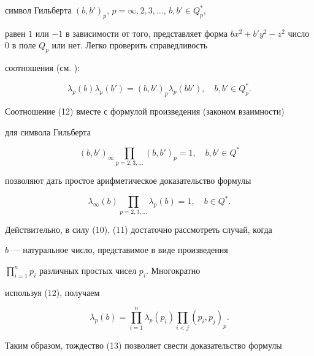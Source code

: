 символ Гильберта $(b,b')_p$, $p=\infty,2,3,\dotsc$, $b,b'\in Q^*_p$, 


равен $1$ или $-1$ в зависимости от того, представляет форма $b x^2+b' 


y^2-z^2$ число $0$ в поле $Q_p$ или нет. Легко проверить справедливость 


соотношения (см. \cite{1}): 


\begin{equation} 


\lambda_p(b)\lambda_p(b')=(b,b')_p 


\lambda_p(b b'),\quad b,b'\in Q^*_p. 


\end{equation} 


 


Соотношение (12) вместе с формулой произведения (законом взаимности) 


для символа Гильберта \cite{4} 


\begin{equation} 


(b,b')_\infty\prod_{p=2,3,\dotsc}(b,b')_p=1,\quad 


b,b'\in Q^* 


\end{equation} 


позволяют дать простое арифметическое доказательство формулы 


\begin{equation} 


\lambda_\infty(b)\prod_{p=2,3,\dotsc}\lambda_p(b)=1,\quad 


b\in Q^*. 


\end{equation} 


Действительно, в силу (10), (11) достаточно рассмотреть случай, когда 


$b$ --- натуральное число, представимое в виде произведения 


$\prod\limits^n_{i=1}p_i$ различных простых чисел $p_i$. Многократно 


используя (12), получаем 


\begin{equation} 


\lambda_p(b)=\prod^n_{i=1}\lambda_p(p_i) 


\prod_{i<j}(p_i,p_j)_p. 


\end{equation} 


Таким образом, тождество (13) позволяет свести доказательство формулы 


